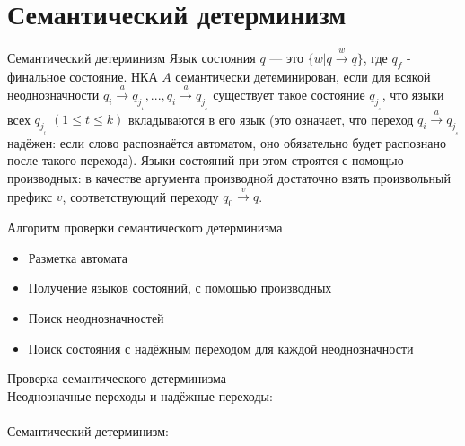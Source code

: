 \section{Семантический детерминизм}
\begin{frame}{Семантический детерминизм}
    \vspace{-5pt}
     Язык состояния $q$ — это $\{w | q \xrightarrow{\text{$w$}} q\}$, где $q_f$  - финальное состояние. НКА $A$ семантически детеминирован, если для всякой неоднозначности $q_i \xrightarrow{\text{$a$}} {q_j__1} , ..., {q_i \xrightarrow{\text{$a$}} q_j__k}$ существует такое состояние $q_j__s$, что языки всех  $q_j__t$ $(1 \leqslant t \leqslant k)$ вкладываются в его язык (это означает, что переход $q_i \xrightarrow{\text{$a$}} {q_j__s}$ надёжен: если слово распознаётся автоматом, оно обязательно будет распознано после такого перехода).
     Языки состояний при этом строятся с помощью производных: в качестве аргумента производной достаточно взять произвольный префикс $v$, соответствующий переходу $q_0 \xrightarrow{\text{$v$}} q$.
\end{frame} %
\begin{frame}{Алгоритм проверки семантического детерминизма}
    \vspace{-5pt}
    \begin{itemize}
        \item Разметка автомата
        \item Получение языков состояний, с помощью производных
        \item Поиск неоднозначностей
        \item Поиск состояния с надёжным переходом для каждой неоднозначности
    \end{itemize}
    
\end{frame}
\begin{frame}{Проверка семантического детерминизма}
    \vspace{-5pt}
    \\Неоднозначные переходы и надёжные переходы:
    \\%
    \\Семантический детерминизм:
\end{frame}